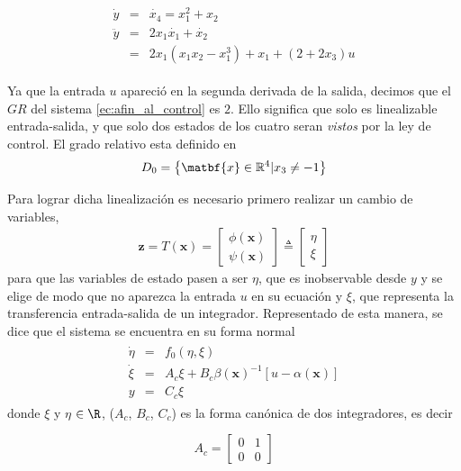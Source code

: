 \documentclass[10pt]{article}
\begin{document}
\begin{align}
\begin{array}{rcl}
    \dot{y}&=&\dot{x_{4}}= x_{1}^{2} + x_{2} \\
    \ddot{y} &=& 2x_{1}\dot{x_{1}} + \dot{x_{2}} \\
    &= & 2x_{1} (x_{1}x_{2}-x_{1}^3) + x_{1} + (2 + 2x_{3})u
\end{array}
\end{align}

Ya que la entrada $u$ apareció en la segunda derivada de la salida, decimos que el $GR$ del sistema \eqref{ec:afin_al_control} es $2$.
Ello significa que solo es linealizable entrada-salida, y que solo dos estados de los cuatro seran \textit{vistos} por la ley de control.
El grado relativo esta definido en
\begin{equation}
    D_{0} = \left\{\matbf{x} \in \mathbb{R}^{4} | x_{3} \neq -1 \right\}
\end{equation}

Para lograr dicha linealización es necesario primero realizar un cambio de variables,
%
\begin{align}
    \mathbf{z} = T(\mathbf{x}) = \begin{bmatrix} \phi(\mathbf{x}) \\ \psi(\mathbf{x}) \end{bmatrix} \triangleq \begin{bmatrix} \eta \\ \xi \end{bmatrix}
\label{ec:difeo}
\end{align}
%
para que las variables de estado pasen a ser $\eta$, que es inobservable desde $y$ y se elige de modo que no aparezca la entrada $u$ en su ecuación y $\xi$, que representa la transferencia entrada-salida de un integrador. Representado de esta manera, se dice que el sistema se encuentra en su forma normal
%
\begin{align}
\begin{array}{rcl}
\dot{\eta} & = & f_0(\eta,\xi) \\
\dot{\xi} & = & A_c \xi + B_c \beta(\mathbf{x})^{-1}[u-\alpha(\mathbf{x})] \\
y & = & C_c \xi
\end{array}
\label{ec:sistnor}
\end{align}
%
donde $\xi$ y $\eta$ $\in \R$, ($A_c$, $B_c$, $C_c$) es la forma canónica de dos integradores, es decir 


\begin{equation}
A_{c}=
\begin{bmatrix}
  0 & 1\\
  0 & 0
\end{bmatrix}
\end{equation}
\end{document}
